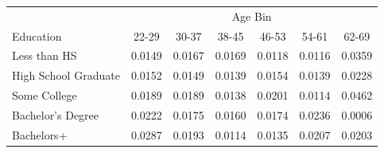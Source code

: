 \begin{tabular}{lcccccc}
\hline\hline
 & \multicolumn{6}{c}{Age Bin} \\
Education & 22-29 & 30-37 & 38-45 & 46-53 & 54-61 & 62-69 \\
\hline
Less than HS&0.0149&0.0167&0.0169&0.0118&0.0116&0.0359\\
High School Graduate&0.0152&0.0149&0.0139&0.0154&0.0139&0.0228\\
Some College&0.0189&0.0189&0.0138&0.0201&0.0114&0.0462\\
Bachelor's Degree&0.0222&0.0175&0.0160&0.0174&0.0236&0.0006\\
Bachelors+&0.0287&0.0193&0.0114&0.0135&0.0207&0.0203\\
\hline\hline
\end{tabular}
